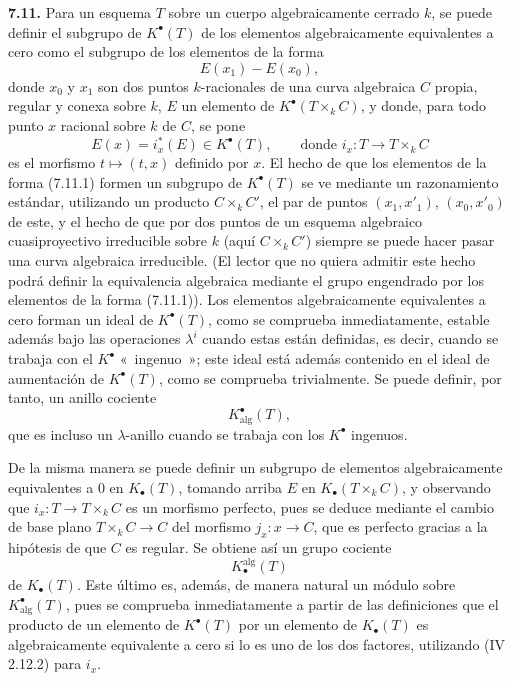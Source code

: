 \textbf{7.11.} Para un esquema \(T\) sobre un cuerpo algebraicamente cerrado \(k\), se puede definir el subgrupo de \(K^\bullet(T)\) de los elementos algebraicamente equivalentes a cero como el subgrupo de los elementos de la forma
\begin{equation}\tag{7.11.1}
  E(x_1)-E(x_0),
\end{equation}
donde \(x_0\) y \(x_1\) son dos puntos \(k\)-racionales de una curva algebraica \(C\) propia, regular y conexa sobre \(k\), \(E\) un elemento de \(K^\bullet(T\times_k C)\), y donde, para todo punto \(x\) racional sobre \(k\) de \(C\), se pone
\[
  E(x)=i_x^*(E)\in K^\bullet(T),\qquad\text{donde }
  i_x:T\longrightarrow T\times_k C
\]
es el morfismo \(t\mapsto(t,x)\) definido por \(x\). El hecho de que los elementos de la forma (7.11.1) formen un subgrupo de \(K^\bullet(T)\) se ve mediante un razonamiento estándar, utilizando un producto \(C\times_k C'\), el par de puntos \((x_1,x'_1)\), \((x_0,x'_0)\) de este, y el hecho de que por dos puntos de un esquema algebraico cuasiproyectivo irreducible sobre \(k\) (aquí \(C\times_k C'\)) siempre se puede hacer pasar una curva algebraica irreducible. (El lector que no quiera admitir este hecho podrá definir la equivalencia algebraica mediante el grupo engendrado por los elementos de la forma (7.11.1)). Los elementos algebraicamente equivalentes a cero forman un ideal de \(K^\bullet(T)\), como se comprueba inmediatamente, estable además bajo las operaciones \(\lambda^i\) cuando estas están definidas, es decir, cuando se trabaja con el \(K^\bullet\) «~ingenuo~»; este ideal está además contenido en el ideal de aumentación de \(K^\bullet(T)\), como se comprueba trivialmente. Se puede definir, por tanto, un anillo cociente
\begin{equation}\tag{7.11.2}
  K^\bullet_{\mathrm{alg}}(T),
\end{equation}
que es incluso un \(\lambda\)-anillo cuando se trabaja con los \(K^\bullet\) ingenuos.

De la misma manera se puede definir un subgrupo de elementos algebraicamente equivalentes a 0 en \(K_\bullet(T)\), tomando arriba \(E\) en \(K_\bullet(T\times_k C)\), y observando que \(i_x:T\to T\times_k C\) es un morfismo perfecto, pues se deduce mediante el cambio de base plano \(T\times_k C\to C\) del morfismo \(j_x:x\to C\), que es perfecto gracias a la hipótesis de que \(C\) es regular. Se obtiene así un grupo cociente
\begin{equation}\tag{7.11.3}
  K_\bullet^{\mathrm{alg}}(T)
\end{equation}
de \(K_\bullet(T)\). Este último es, además, de manera natural un módulo sobre \(K^\bullet_{\mathrm{alg}}(T)\), pues se comprueba inmediatamente a partir de las definiciones que el producto de un elemento de \(K^\bullet(T)\) por un elemento de \(K_\bullet(T)\) es algebraicamente equivalente a cero si lo es uno de los dos factores, utilizando (IV 2.12.2) para \(i_x\).


